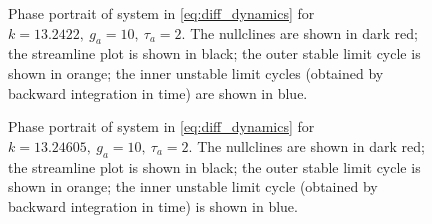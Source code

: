 \begin{figure}[!h]
        \caption{\label{fig:eq2D_cycle_homoclinic} Phase portrait of system in \eqref{eq:diff_dynamics} for $k=13.2422,\ g_a=10,\ \tau_a=2$. The nullclines are shown in dark red; the streamline plot is shown in black; the outer stable limit cycle is shown in orange; the inner unstable limit cycles (obtained by backward integration in time) are shown in blue.}
\end{figure}

\begin{figure}[!h]
        \caption{\label{fig:eq2D_cycle_before_collapse} Phase portrait of system in \eqref{eq:diff_dynamics} for $k=13.24605,\ g_a=10,\ \tau_a=2$. The nullclines are shown in dark red; the streamline plot is shown in black; the outer stable limit cycle is shown in orange; the inner unstable limit cycle (obtained by backward integration in time) is shown in blue.}
\end{figure}


